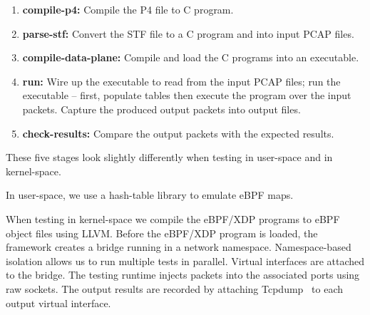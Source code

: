 \begin{enumerate}
\item\textbf{compile-p4:} Compile the P4 file to C program.
\item \textbf{parse-stf:} Convert the STF file to a C program and into
  input PCAP files.
\item \textbf{compile-data-plane:} Compile and load the C programs
  into an executable.
\item \textbf{run:} Wire up the executable to read from the input PCAP
  files; run the executable -- first, populate tables then execute the
  program over the input packets.  Capture the produced output packets
  into output files.
\item \textbf{check-results:} Compare the output packets with the
  expected results.
\end{enumerate}

\noindent These five stages look slightly differently when testing in
user-space and in kernel-space.

In user-space, we use a hash-table library to emulate eBPF maps.

When testing in kernel-space we compile the eBPF/XDP programs to eBPF
object files using LLVM.  Before the eBPF/XDP program is loaded, the
framework creates a bridge running in a network namespace.
Namespace-based isolation allows us to run multiple tests in parallel.
Virtual interfaces are attached to the bridge.  The testing runtime
injects packets into the associated ports using raw sockets. The
output results are recorded by attaching Tcpdump~\cite{tcpdump} to
each output virtual interface.
